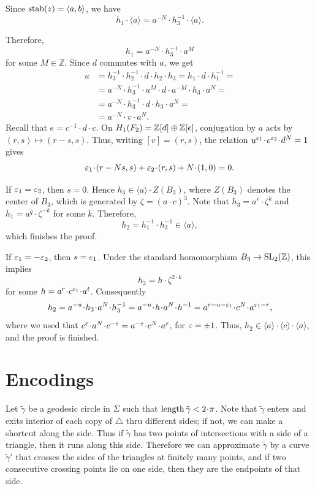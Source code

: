 \documentclass[a4paper,10pt]{article}
\begin{document}
Since $\mathrm{stab}(z)=\langle a,b\rangle$, we have
\[h_1\cdot\langle a\rangle= a^{-N}\cdot h_3^{-1}\cdot\langle a\rangle.\]

Therefore,
\[
h_1=a^{-N}\cdot h_3^{-1}\cdot a^M\]
for some $M\in\mathbb Z$.
Since $d$ commutes with $a$, we get
\begin{align*}
u&=h_3^{-1}\cdot h_2^{-1}\cdot d\cdot h_2\cdot h_3=h_1\cdot d\cdot h_1^{-1}=
\\
&=a^{-N}\cdot h_3^{-1}\cdot a^M\cdot d \cdot a^{-M}\cdot h_3\cdot a^N=
\\
&=a^{-N}\cdot h_3^{-1}\cdot d \cdot h_3\cdot a^N=
\\
&=a^{-N}\cdot v\cdot a^N.
\end{align*}
Recall that $e=c^{-1}\cdot d\cdot c$.
On $H_1(F_2)=\mathbb{Z}[d]\oplus\mathbb{Z}[e]$, conjugation by $a$
acts by $(r,s)\mapsto(r-s,s)$.
Thus, writing $[v]=(r,s)$, the relation
$u^{\eps_1}\cdot v^{\eps_2}\cdot d^N=1$ gives
\[
\eps_1\cdot (r-Ns,s)+\eps_2\cdot (r,s)+N\cdot (1,0)=0.
\]

If $\varepsilon_1=\varepsilon_2$, then $s=0$.
Hence $h_3\in\langle a\rangle\cdot Z(B_3)$,
where $Z(B_3)$ denotes the center of $B_3$, which is generated by $\zeta=(a\cdot c)^3$.
Note that $h_3=a^r\cdot\zeta^k$ and $h_1=a^q\cdot \zeta^{-k}$ for some $k$.
Therefore,
\[h_2=h_1^{-1}\cdot h_3^{-1}\in\langle a\rangle,\]
which finishes the proof.

If $\varepsilon_1=-\varepsilon_2$, then $s=\varepsilon_1$.
Under the standard homomorphism
$B_3\to \operatorname{\rm SL}_2(\mathbb Z)$, this implies
\[
h_3=h\cdot \zeta^{2\cdot k}
\]
for some $h=a^r\cdot  c^{\eps_1}\cdot a^t$.
Consequently
\[
h_2
=a^{-u}\cdot h_3\cdot a^N\cdot h_3^{-1}
=a^{-u}\cdot h\cdot a^N\cdot h^{-1}
=a^{r-u-\eps_1}\cdot c^N\cdot a^{\eps_1-r},
\]
where we used that
$c^\eps\cdot  a^N\cdot  c^{-\eps}
=a^{-\eps}\cdot c^N\cdot a^\eps$, for $\varepsilon=\pm1$.
Thus, $h_2\in\langle a\rangle\cdot \langle c\rangle\cdot \langle a\rangle$, and the proof is finished.
\qeds

\section{Encodings}\label{sec:encodings}

Let $\tilde \gamma$ be a geodesic circle in $\Sigma$ such that $\length\tilde\gamma<2\cdot\pi$.
Note that $\tilde \gamma$ enters and exits interior of each copy of $\triangle$ thru different sides;
if not, we can make a shortcut along the side.
Thus if $\tilde \gamma$ has two points of intersections with a side of a triangle,
then it runs along this side.
Therefore we can approximate $\tilde\gamma$ by a curve $\tilde\gamma'$ that crosses the sides of the triangles at finitely many points, and if two consecutive crossing points lie on one side, then they are the endpoints of that side.
\end{document}
